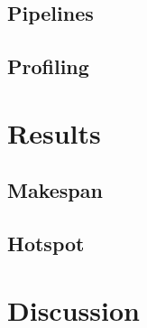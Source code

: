 \documentclass[conference]{IEEEtran}
\begin{document}
\subsection{Pipelines}



\subsection{Profiling}


\section{Results}

\subsection{Makespan}


\subsection{Hotspot}
% 


\section{Discussion}

\end{document}
